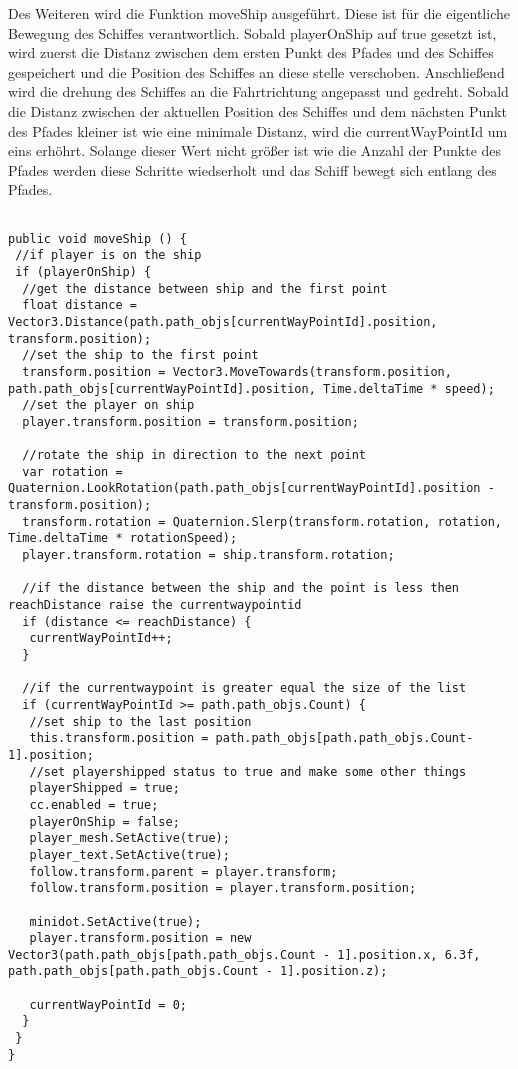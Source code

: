 Des Weiteren wird die Funktion moveShip ausgeführt. Diese ist für die eigentliche Bewegung des Schiffes verantwortlich. Sobald playerOnShip auf true gesetzt ist, wird zuerst die Distanz zwischen dem ersten Punkt des Pfades und des Schiffes gespeichert und die Position des Schiffes an diese stelle verschoben. Anschließend wird die drehung des Schiffes an die Fahrtrichtung angepasst und gedreht. Sobald die Distanz zwischen der aktuellen Position des Schiffes und dem nächsten Punkt des Pfades kleiner ist wie eine minimale Distanz, wird die currentWayPointId um eins erhöhrt. Solange dieser Wert nicht größer ist wie die Anzahl der Punkte des Pfades werden diese Schritte wiedserholt und das Schiff bewegt sich entlang des Pfades.

\begin{scriptsize}
\lstset{
	float,
	caption=Methode moveShip, 
	language=[Sharp]C, 
	frame=single,  
	showstringspaces=false, 
	showspaces=false, 
	numbers=left, 
	captionpos=b, 
	belowcaptionskip=4pt,
	basicstyle=\ttfamily
} 
\begin{lstlisting}[label=lst:methode2]

public void moveShip () {
 //if player is on the ship
 if (playerOnShip) {
  //get the distance between ship and the first point
  float distance = Vector3.Distance(path.path_objs[currentWayPointId].position, transform.position);
  //set the ship to the first point
  transform.position = Vector3.MoveTowards(transform.position, path.path_objs[currentWayPointId].position, Time.deltaTime * speed);
  //set the player on ship
  player.transform.position = transform.position;

  //rotate the ship in direction to the next point
  var rotation = Quaternion.LookRotation(path.path_objs[currentWayPointId].position - transform.position);
  transform.rotation = Quaternion.Slerp(transform.rotation, rotation, Time.deltaTime * rotationSpeed);
  player.transform.rotation = ship.transform.rotation;

  //if the distance between the ship and the point is less then reachDistance raise the currentwaypointid
  if (distance <= reachDistance) {
   currentWayPointId++;
  }

  //if the currentwaypoint is greater equal the size of the list
  if (currentWayPointId >= path.path_objs.Count) {
   //set ship to the last position
   this.transform.position = path.path_objs[path.path_objs.Count-1].position;
   //set playershipped status to true and make some other things
   playerShipped = true;
   cc.enabled = true;
   playerOnShip = false;
   player_mesh.SetActive(true);
   player_text.SetActive(true);
   follow.transform.parent = player.transform;
   follow.transform.position = player.transform.position;

   minidot.SetActive(true);
   player.transform.position = new Vector3(path.path_objs[path.path_objs.Count - 1].position.x, 6.3f, path.path_objs[path.path_objs.Count - 1].position.z);
                
   currentWayPointId = 0;
  }
 }
}
    
\end{lstlisting}
\end{scriptsize}

